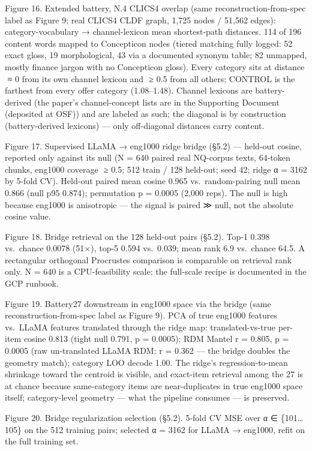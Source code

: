 \documentclass[
]{article}
\begin{document}
Figure 16. Extended battery, N.4 CLICS4 overlap (same
reconstruction-from-spec label as Figure 9; real CLICS4 CLDF graph,
1,725 nodes / 51,562 edges): category-vocabulary {→} channel-lexicon
mean shortest-path distances. 114 of 196 content words mapped to
Concepticon nodes (tiered matching fully logged: 52 exact gloss, 19
morphological, 43 via a documented synonym table; 82 unmapped, mostly
finance jargon with no Concepticon gloss). Every category sits at
distance { ≈ 0} from its own channel lexicon and { ≥ 0.5} from all
others; CONTROL is the farthest from every offer category (1.08--1.48).
Channel lexicons are battery-derived (the paper's channel-concept lists
are in the Supporting Document (deposited at OSF)) and are labeled as
such; the diagonal is by construction (battery-derived lexicons) ---
only off-diagonal distances carry content.

Figure 17. Supervised LLaMA {→} eng1000 ridge bridge (§5.2) --- held-out
cosine, reported only against its null ({N = 640} paired real NQ-corpus
texts, 64-token chunks, eng1000 coverage { ≥ 0.5}; 512 train / 128
held-out; seed 42; ridge {α = 3162} by 5-fold CV). Held-out paired mean
cosine 0.965 vs.~random-pairing null mean 0.866 (null p95 0.874);
permutation {p = 0.0005} (2{,}000 reps). The null is high because
eng1000 is anisotropic --- the signal is paired {≫} null, not the
absolute cosine value.

Figure 18. Bridge retrieval on the 128 held-out pairs (§5.2). Top-1
0.398 vs.~chance 0.0078 (51{×}), top-5 0.594 vs.~0.039; mean rank 6.9
vs.~chance 64.5. A rectangular orthogonal Procrustes comparison is
comparable on retrieval rank only. {N = 640} is a CPU-feasibility scale;
the full-scale recipe is documented in the GCP runbook.

Figure 19. Battery27 downstream in eng1000 space via the bridge (same
reconstruction-from-spec label as Figure 9). PCA of true eng1000
features vs.~LLaMA features translated through the ridge map:
translated-vs-true per-item cosine 0.813 (tight null 0.791,
{p = 0.0005}); RDM Mantel {r = 0.805}, {p = 0.0005} (raw un-translated
LLaMA RDM: {r = 0.362} --- the bridge doubles the geometry match);
category LOO decode 1.00. The ridge's regression-to-mean shrinkage
toward the centroid is visible, and exact-item retrieval among the 27 is
at chance because same-category items are near-duplicates in true
eng1000 space itself; category-level geometry --- what the pipeline
consumes --- is preserved.

Figure 20. Bridge regularization selection (§5.2). 5-fold CV MSE over
{α ∈ \{101\ldots105\}} on the 512 training pairs; selected {α = 3162}
for LLaMA {→} eng1000, refit on the full training set.
\end{document}
